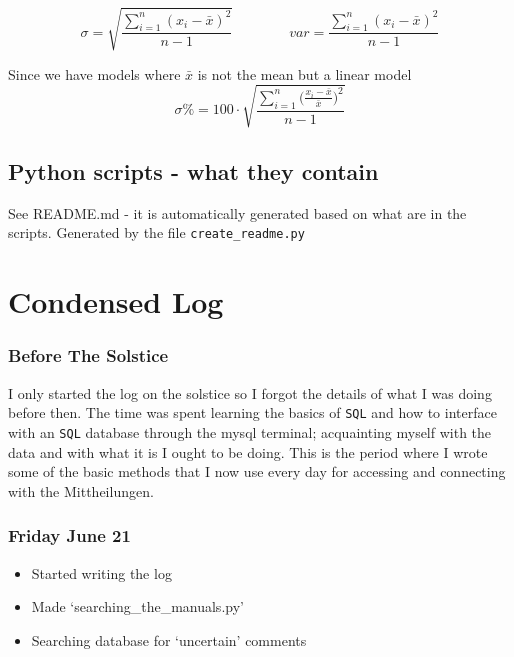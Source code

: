 \documentclass[12pt]{article}
\begin{document}
\begin{equation}\label{standard deviation equation}
    \sigma = \sqrt{\frac{\sum_{i=1}^{n} (x_i - \bar{x})^2}{n-1}}  \quad \quad \quad \quad 
    var = \frac{\sum_{i=1}^{n} (x_i - \bar{x})^2}{n-1}
\end{equation}

Since we have models where $\bar{x}$ is not the mean but a linear model
\begin{equation}\label{standard deviation percentage equation}
    \sigma\% = 100\cdot \sqrt{\frac{\sum_{i=1}^{n}\big(\frac{x_i-\bar{x}}{\bar{x}}\big)^2}{n-1}}
\end{equation}


\subsection{Python scripts - what they contain}

See README.md - it is automatically generated based on what are in the scripts. Generated by the file \texttt{create\_readme.py}

\section{Condensed Log}

\subsubsection{Before The Solstice}
I only started the log on the solstice so I forgot the details of what I was doing before then. The time was spent learning the basics of \texttt{SQL} and how to interface with an \texttt{SQL} database through the mysql terminal; acquainting myself with the data and with what it is I ought to be doing. This is the period where I wrote some of the basic methods that I now use every day for accessing and connecting with the Mittheilungen.

\subsubsection{Friday June 21}
\begin{itemize}
    \item Started writing the log
    \item Made `searching\_the\_manuals.py'
    \item Searching database for `uncertain' comments
\end{itemize}
    
\end{document}
